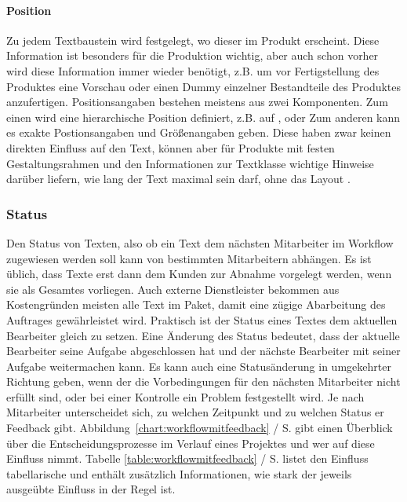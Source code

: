 \paragraph{Position} Zu jedem Textbaustein wird festgelegt, wo dieser im Produkt erscheint. Diese Information ist besonders für die Produktion wichtig, aber auch schon vorher wird diese Information immer wieder benötigt, z.B. um vor Fertigstellung des Produktes eine Vorschau oder einen Dummy einzelner Bestandteile des Produktes anzufertigen. Positionsangaben bestehen meistens aus zwei Komponenten. Zum einen wird eine hierarchische Position definiert, z.B. auf , oder  Zum anderen kann es exakte Postionsangaben und Größenangaben geben. Diese haben zwar keinen direkten Einfluss auf den Text, können aber für Produkte mit festen Gestaltungsrahmen und den Informationen zur Textklasse wichtige Hinweise darüber liefern, wie lang der Text maximal sein darf, ohne das Layout .

\subsubsection{Status}\label{l:konzept-workflow-status}

Den Status von Texten, also ob ein Text dem nächsten Mitarbeiter im Workflow zugewiesen werden soll kann von bestimmten Mitarbeitern abhängen. Es ist üblich, dass Texte erst dann dem Kunden zur Abnahme vorgelegt werden, wenn sie als Gesamtes vorliegen. Auch externe Dienstleister bekommen aus Kostengründen meisten alle Text im Paket, damit eine zügige Abarbeitung des Auftrages gewährleistet wird. Praktisch ist der Status eines Textes dem aktuellen Bearbeiter gleich zu setzen. Eine Änderung des Status bedeutet, dass der aktuelle Bearbeiter seine Aufgabe abgeschlossen hat und der nächste Bearbeiter mit seiner Aufgabe weitermachen kann. Es kann auch eine Statusänderung in umgekehrter Richtung geben, wenn der die Vorbedingungen für den nächsten Mitarbeiter nicht erfüllt sind, oder bei einer Kontrolle ein Problem festgestellt wird. Je nach Mitarbeiter unterscheidet sich, zu welchen Zeitpunkt und zu welchen Status er Feedback gibt. Abbildung~\ref{chart:workflowmitfeedback} / S.\pageref{chart:workflowmitfeedback} gibt einen Überblick über die Entscheidungsprozesse im Verlauf eines Projektes und wer auf diese Einfluss nimmt. Tabelle \ref{table:workflowmitfeedback} / S.\pageref{table:workflowmitfeedback} listet den Einfluss tabellarische und enthält zusätzlich Informationen, wie stark der jeweils ausgeübte Einfluss in der Regel ist.

